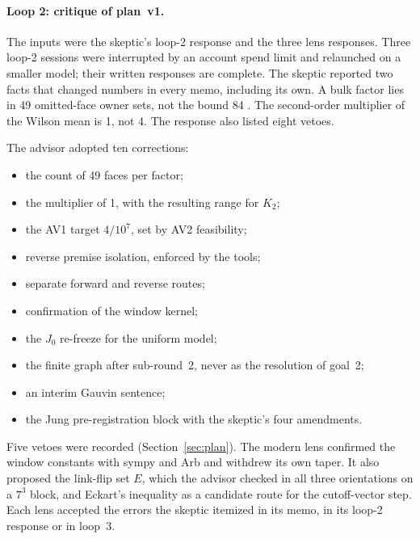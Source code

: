 \paragraph{Loop 2: critique of plan~v1.}
The inputs were the skeptic's loop-2 response and the three lens responses.
Three loop-2 sessions were interrupted by an account spend limit and
relaunched on a smaller model; their written responses are complete. The
skeptic reported two facts that changed numbers in every memo, including its
own. A bulk factor lies in 49 omitted-face owner sets, not the bound 84
\cite{r21i1}. The second-order multiplier of the Wilson mean is 1, not 4. The
response also listed eight vetoes.

The advisor adopted ten corrections:
\begin{itemize}
\item the count of 49 faces per factor;
\item the multiplier of 1, with the resulting range for $K_2$;
\item the AV1 target $4/10^7$, set by AV2 feasibility;
\item reverse premise isolation, enforced by the tools;
\item separate forward and reverse routes;
\item confirmation of the window kernel;
\item the $J_0$ re-freeze for the uniform model;
\item the finite graph after sub-round~2, never as the resolution of goal~2;
\item an interim Gauvin sentence;
\item the Jung pre-registration block with the skeptic's four amendments.
\end{itemize}
Five vetoes were recorded (Section~\ref{sec:plan}). The modern lens confirmed
the window constants with sympy and Arb and withdrew its own taper. It also
proposed the link-flip set $E$, which the advisor checked in all three
orientations on a $7^3$ block, and Eckart's inequality as a candidate route
for the cutoff-vector step. Each lens accepted the errors the skeptic
itemized in its memo, in its loop-2 response or in loop~3.

